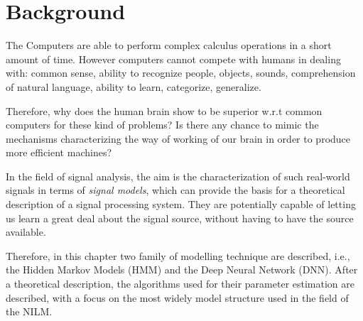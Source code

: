 \chapter{Background}\label{ch:backg}

The Computers are able to perform complex calculus operations in a short amount of time.
However computers cannot compete with humans in dealing with: common sense, ability to recognize people, objects, sounds, comprehension of natural language, ability to learn, categorize, generalize.

Therefore, why does the human brain show to be superior w.r.t common computers for these kind of problems?
Is there any chance to mimic the mechanisms characterizing the way of working of our brain in order to produce more efficient machines?

In the field of signal analysis, the aim is the characterization of such real-world signals in terms of \textit{signal models}, which can provide the basis for a theoretical description of a signal processing system.
They are potentially capable of letting us learn a great deal about the signal source, without having to have the source available.

Therefore, in this chapter two family of modelling technique are described, i.e., the Hidden Markov Models (HMM) and the Deep Neural Network (DNN).
After a theoretical description, the algorithms used for their parameter estimation are described, with a focus on the most widely model structure used in the field of the NILM.





